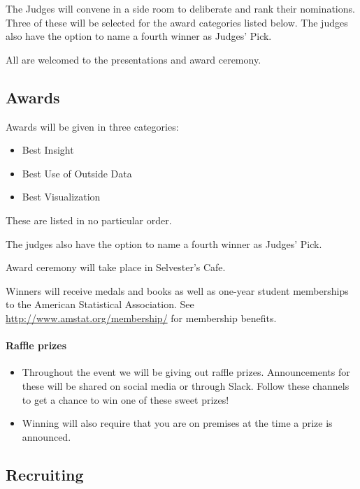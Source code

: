 \documentclass[]{article}
\providecommand{\tightlist}{%
  \setlength{\itemsep}{0pt}\setlength{\parskip}{0pt}}
\let\oldparagraph\paragraph
\renewcommand{\paragraph}[1]{\oldparagraph{#1}\mbox{}}
\begin{document}
The Judges will convene in a side room to deliberate and rank their
nominations. Three of these will be selected for the award categories
listed below. The judges also have the option to name a fourth winner as
Judges' Pick.

All are welcomed to the presentations and award ceremony.

\hypertarget{awards}{%
\subsection{Awards}\label{awards}}

Awards will be given in three categories:

\begin{itemize}
\tightlist
\item
  Best Insight
\item
  Best Use of Outside Data
\item
  Best Visualization
\end{itemize}

These are listed in no particular order.

The judges also have the option to name a fourth winner as Judges' Pick.

Award ceremony will take place in Selvester's Cafe.

Winners will receive medals and books as well as one-year student
memberships to the American Statistical Association. See
\url{http://www.amstat.org/membership/} for membership benefits.

\hypertarget{raffle-prizes}{%
\paragraph{Raffle prizes}\label{raffle-prizes}}

\begin{itemize}
\tightlist
\item
  Throughout the event we will be giving out raffle prizes.
  Announcements for these will be shared on social media or through
  Slack. Follow these channels to get a chance to win one of these sweet
  prizes!
\item
  Winning will also require that you are on premises at the time a prize
  is announced.
\end{itemize}

\hypertarget{recruiting}{%
\subsection{Recruiting}\label{recruiting}}
\end{document}
